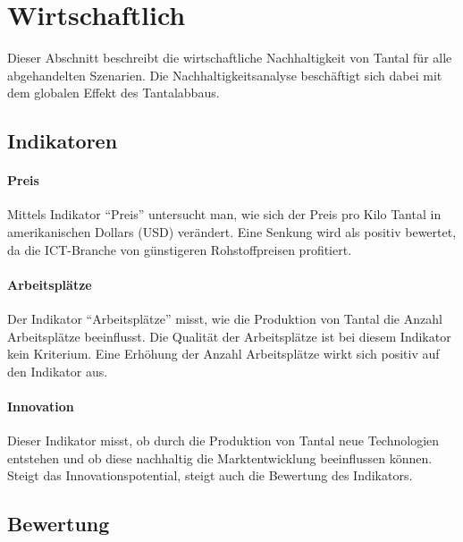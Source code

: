 
\section{Wirtschaftlich}\label{sec:conflict}

Dieser Abschnitt beschreibt die wirtschaftliche Nachhaltigkeit von Tantal für alle abgehandelten Szenarien. Die Nachhaltigkeitsanalyse beschäftigt sich dabei mit dem globalen Effekt des Tantalabbaus.

\subsection{Indikatoren}

\paragraph{Preis}
Mittels Indikator ``Preis'' untersucht man, wie sich der Preis pro Kilo Tantal
in amerikanischen Dollars (USD) verändert. Eine Senkung wird als positiv bewertet, da die ICT-Branche von günstigeren Rohstoffpreisen profitiert. 

\paragraph{Arbeitsplätze}
Der Indikator ``Arbeitsplätze'' misst, wie die Produktion von Tantal die Anzahl
Arbeitsplätze beeinflusst. Die Qualität der Arbeitsplätze ist bei diesem Indikator kein Kriterium. Eine Erhöhung der Anzahl Arbeitsplätze wirkt sich positiv auf den Indikator aus.

\paragraph{Innovation}
Dieser Indikator misst, ob durch die Produktion von Tantal neue Technologien
entstehen und ob diese nachhaltig die Marktentwicklung beeinflussen können. Steigt das Innovationspotential, steigt auch die Bewertung des Indikators.

\subsection{Bewertung}

